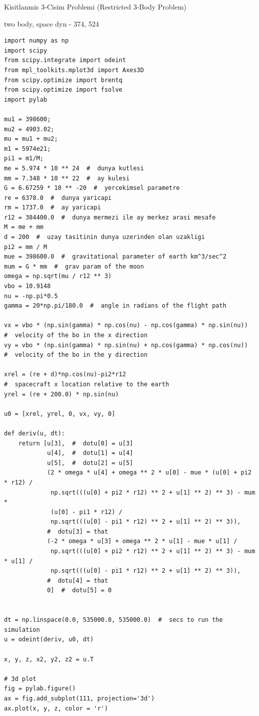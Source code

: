 \documentclass[12pt,fleqn]{article}\usepackage{../../common}
\begin{document}
Kisitlanmis 3-Cisim Problemi (Restricted 3-Body Problem)

two body, space dyn - 374, 524

\begin{verbatim}
import numpy as np
import scipy
from scipy.integrate import odeint
from mpl_toolkits.mplot3d import Axes3D
from scipy.optimize import brentq
from scipy.optimize import fsolve
import pylab

mu1 = 398600;
mu2 = 4903.02;
mu = mu1 + mu2;
m1 = 5974e21;
pi1 = m1/M;
me = 5.974 * 10 ** 24  #  dunya kutlesi
mm = 7.348 * 10 ** 22  #  ay kulesi
G = 6.67259 * 10 ** -20  #  yercekimsel parametre
re = 6378.0  #  dunya yaricapi
rm = 1737.0  #  ay yaricapi
r12 = 384400.0  #  dunya mermezi ile ay merkez arasi mesafe
M = me + mm
d = 200  #  uzay tasitinin dunya uzerinden olan uzakligi
pi2 = mm / M
mue = 398600.0  #  gravitational parameter of earth km^3/sec^2
mum = G * mm  #  grav param of the moon
omega = np.sqrt(mu / r12 ** 3)
vbo = 10.9148
nu = -np.pi*0.5
gamma = 20*np.pi/180.0  #  angle in radians of the flight path

vx = vbo * (np.sin(gamma) * np.cos(nu) - np.cos(gamma) * np.sin(nu))
#  velocity of the bo in the x direction
vy = vbo * (np.sin(gamma) * np.sin(nu) + np.cos(gamma) * np.cos(nu))
#  velocity of the bo in the y direction

xrel = (re + d)*np.cos(nu)-pi2*r12
#  spacecraft x location relative to the earth
yrel = (re + 200.0) * np.sin(nu)

u0 = [xrel, yrel, 0, vx, vy, 0]

def deriv(u, dt):
    return [u[3],  #  dotu[0] = u[3]
            u[4],  #  dotu[1] = u[4]
            u[5],  #  dotu[2] = u[5]
            (2 * omega * u[4] + omega ** 2 * u[0] - mue * (u[0] + pi2 * r12) /
             np.sqrt(((u[0] + pi2 * r12) ** 2 + u[1] ** 2) ** 3) - mum *
             (u[0] - pi1 * r12) /
             np.sqrt(((u[0] - pi1 * r12) ** 2 + u[1] ** 2) ** 3)),
            #  dotu[3] = that
            (-2 * omega * u[3] + omega ** 2 * u[1] - mue * u[1] /
             np.sqrt(((u[0] + pi2 * r12) ** 2 + u[1] ** 2) ** 3) - mum * u[1] /
             np.sqrt(((u[0] - pi1 * r12) ** 2 + u[1] ** 2) ** 3)),
            #  dotu[4] = that
            0]  #  dotu[5] = 0


dt = np.linspace(0.0, 535000.0, 535000.0)  #  secs to run the simulation
u = odeint(deriv, u0, dt)

x, y, z, x2, y2, z2 = u.T

# 3d plot
fig = pylab.figure()
ax = fig.add_subplot(111, projection='3d')
ax.plot(x, y, z, color = 'r')


\end{verbatim}
\end{document}
